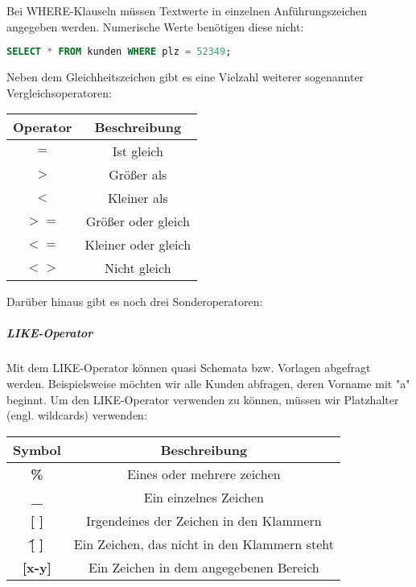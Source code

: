 \documentclass{article}
\begin{document}
	Bei WHERE-Klauseln müssen Textwerte in einzelnen Anführungszeichen angegeben werden. Numerische Werte benötigen diese nicht:

	\begin{lstlisting}[language=SQL]
	SELECT * FROM kunden WHERE plz = 52349;
	\end{lstlisting}

	Neben dem Gleichheitszeichen gibt es eine Vielzahl weiterer sogenannter Vergleichsoperatoren:

	\begin{center}
		\def\arraystretch{1.1}
		\begin{tabular}{ | c | c |}
			\hline 
			\textbf{Operator} 	& \textbf{Beschreibung} \\
			\hline
			\hline
			\textbf{$=$} 		& Ist gleich \\
			\textbf{$>$} 		& Größer als \\
			\textbf{$<$} 		& Kleiner als \\
			\textbf{$>=$} 		& Größer oder gleich \\
			\textbf{$<=$} 		& Kleiner oder gleich \\
			\textbf{$<>$} 		& Nicht gleich \\
			\hline
		\end{tabular}
	\end{center}

	Darüber hinaus gibt es noch drei Sonderoperatoren:

	\subparagraph{LIKE-Operator}
	Mit dem LIKE-Operator können quasi Schemata bzw. Vorlagen abgefragt werden. Beispielsweise möchten wir alle Kunden abfragen, deren Vorname mit "a" beginnt.
	Um den LIKE-Operator verwenden zu können, müssen wir Platzhalter (engl. wildcards) verwenden:
	
	\begin{center}
		\def\arraystretch{1.1}
		\begin{tabular}{ | c | c |}
			\hline
			\textbf{Symbol} 	& \textbf{Beschreibung} \\
			\hline
			\hline
			\textbf{\%} 		& Eines oder mehrere zeichen \\
			\textbf{\_} 		& Ein einzelnes Zeichen \\
			\textbf{[ ]} 		& Irgendeines der Zeichen in den Klammern \\
			\textbf{\^ [  ]} 	& Ein Zeichen, das nicht in den Klammern steht \\
			\textbf{[x-y]} 		& Ein Zeichen in dem angegebenen Bereich \\
			\hline
		\end{tabular}
	\end{center}
\end{document}

